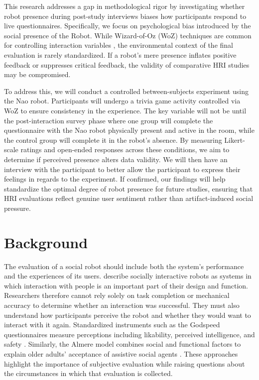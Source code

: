 \documentclass[sigconf,nonacm]{acmart}
\newif\ifdraftspacing
\newcommand{\draftpage}{\ifdraftspacing\clearpage\fi}
\begin{document}
This research addresses a gap in methodological rigor by investigating whether robot presence during post-study interviews biases how participants respond to live questionnaires. Specifically, we focus on psychological bias introduced by the social presence of the Robot. While Wizard-of-Oz (WoZ) techniques are common for controlling interaction variables \cite{riek2012}, the environmental context of the final evaluation is rarely standardized. If a robot's mere presence inflates positive feedback or suppresses critical feedback, the validity of comparative HRI studies may be compromised.

To address this, we will conduct a controlled between-subjects experiment using the Nao robot. Participants will undergo a trivia game activity controlled via WoZ to ensure consistency in the experience. The key variable will not be until the post-interaction survey phase where one group will complete the questionnaire with the Nao robot physically present and active in the room, while the control group will complete it in the robot's absence. By measuring Likert-scale ratings and open-ended responses across these conditions, we aim to determine if perceived presence alters data validity. We will then have an interview with the participant to better allow the participant to express their feelings in regards to the experiment. If confirmed, our findings will help standardize the optimal degree of robot presence for future studies, ensuring that HRI evaluations reflect genuine user sentiment rather than artifact-induced social pressure.
\draftpage

\section{Background}
\label{sec:background}
The evaluation of a social robot should include both the system's performance and the experiences of its users. \citet{fong2003} describe socially interactive robots as systems in which interaction with people is an important part of their design and function. Researchers therefore cannot rely solely on task completion or mechanical accuracy to determine whether an interaction was successful. They must also understand how participants perceive the robot and whether they would want to interact with it again. Standardized instruments such as the Godspeed questionnaires measure perceptions including likability, perceived intelligence, and safety \cite{bartneck2009}. Similarly, the Almere model combines social and functional factors to explain older adults' acceptance of assistive social agents \cite{heerink2010}. These approaches highlight the importance of subjective evaluation while raising questions about the circumstances in which that evaluation is collected.
\end{document}
